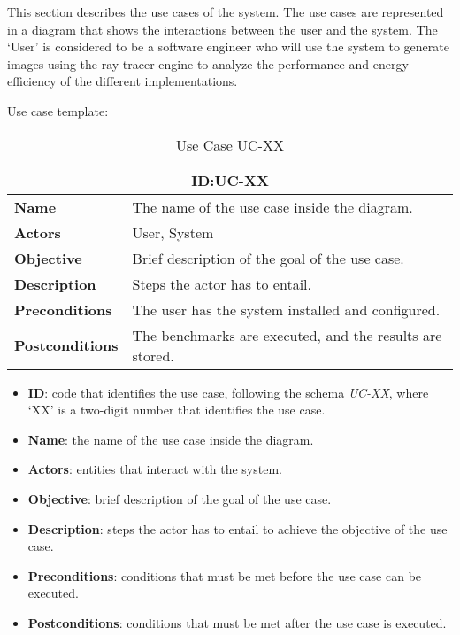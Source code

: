 This section describes the use cases of the system. The use cases are represented in a diagram that shows the interactions between the user and the system. The `User' is considered to be a software engineer who will use the system to generate images using the ray-tracer engine to analyze the performance and energy efficiency of the different implementations.




Use case template:

\begin{table}[H]
    \centering
    \begin{tabular}{l p{10cm}}
        \toprule
        \multicolumn{2}{c}{\textbf{ID:\@ UC-XX}} \\
        \toprule
        \textbf{Name}               &  The name of the use case inside the diagram. \\
        \textbf{Actors}             &  User, System \\
        \textbf{Objective}          &  Brief description of the goal of the use case. \\
        \textbf{Description}        &  Steps the actor has to entail. \\
        \textbf{Preconditions}      &  The user has the system installed and configured. \\
        \textbf{Postconditions}     &  The benchmarks are executed, and the results are stored. \\
    \end{tabular}
    \caption{Use Case UC-XX}\label{tab:uc-xx}
\end{table}

\begin{itemize}
    \item \textbf{ID}: code that identifies the use case, following the schema \textit{UC-XX}, where `XX' is a two-digit number that identifies the use case.
    \item \textbf{Name}: the name of the use case inside the diagram.
    \item \textbf{Actors}: entities that interact with the system.
    \item \textbf{Objective}: brief description of the goal of the use case.
    \item \textbf{Description}: steps the actor has to entail to achieve the objective of the use case.
    \item \textbf{Preconditions}: conditions that must be met before the use case can be executed.
    \item \textbf{Postconditions}: conditions that must be met after the use case is executed.
\end{itemize}

